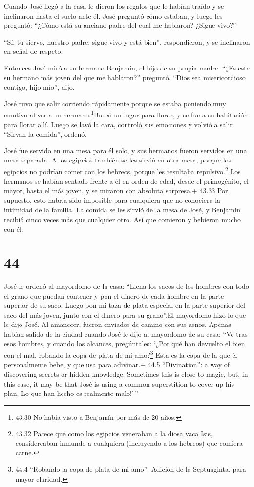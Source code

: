  Cuando José llegó a la casa le dieron los regalos que le
habían traído y se inclinaron hasta el suelo ante él.  José
preguntó cómo estaban, y luego les preguntó: ``¿Cómo está su anciano
padre del cual me hablaron? ¿Sigue vivo?''

 ``Sí, tu siervo, nuestro padre, sigue vivo y está bien'',
respondieron, y se inclinaron en señal de respeto.

 Entonces José miró a su hermano Benjamín, el hijo de su
propia madre. ``¿Es este su hermano más joven del que me hablaron?''
preguntó. ``Dios sea misericordioso contigo, hijo mío'', dijo.

 José tuvo que salir corriendo rápidamente porque se estaba
poniendo muy emotivo al ver a su hermano.\footnote{43.30 No había visto
  a Benjamín por más de 20 años.}Buscó un lugar para llorar, y se fue a
su habitación para llorar allí.  Luego se lavó la cara,
controló sus emociones y volvió a salir. ``Sirvan la comida'', ordenó.

 José fue servido en una mesa para él solo, y sus hermanos
fueron servidos en una mesa separada. A los egipcios también se les
sirvió en otra mesa, porque los egipcios no podrían comer con los
hebreos, porque les resultaba repulsivo.\footnote{43.32 Parece que como
  los egipcios veneraban a la diosa vaca Isis, considereaban inmundo a
  cualquiera (incluyendo a los hebreos) que comiera carne.}
 Los hermanos se habían sentado frente a él en orden de
edad, desde el primogénito, el mayor, hasta el más joven, y se miraron
con absoluta sorpresa.+ 43.33 Por supuesto, esto habría sido imposible
para cualquiera que no conociera la intimidad de la familia.
 La comida se les sirvió de la mesa de José, y Benjamín
recibió cinco veces más que cualquier otro. Así que comieron y bebieron
mucho con él.

\hypertarget{section-43}{%
\section{44}\label{section-43}}

 José le ordenó al mayordomo de la casa: ``Llena los sacos
de los hombres con todo el grano que puedan contener y pon el dinero de
cada hombre en la parte superior de su saco.  Luego pon mi
taza de plata especial en la parte superior del saco del más joven,
junto con el dinero para su grano''.El mayordomo hizo lo que le dijo
José.  Al amanecer, fueron enviados de camino con sus asnos.
 Apenas habían salido de la ciudad cuando José le dijo al
mayordomo de su casa: ``Ve tras esos hombres, y cuando los alcances,
pregúntales: `¿Por qué han devuelto el bien con el mal, robando la copa
de plata de mi amo?\footnote{44.4 ``Robando la copa de plata de mi
  amo'': Adición de la Septuaginta, para mayor claridad.} 
Esta es la copa de la que él personalmente bebe, y que usa para
adivinar.+ 44.5 ``Divination'': a way of discovering secrets or hidden
knowledge. Sometimes this is close to magic, but, in this case, it may
be that José is using a common superstition to cover up his plan. Lo que
han hecho es realmente malo!'\,''

